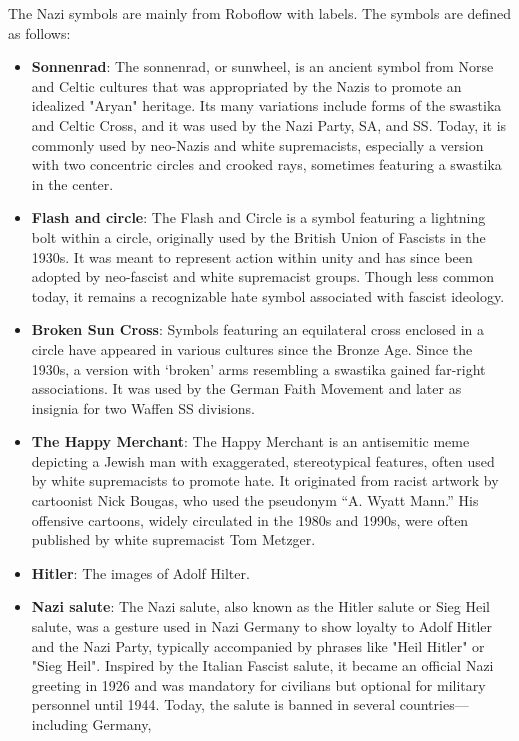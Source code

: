 The Nazi symbols are mainly from Roboflow with labels. The symbols are defined as follows:

\begin{itemize}
  \item \textbf{Sonnenrad}: The sonnenrad, or sunwheel, is an ancient symbol
  from Norse and Celtic cultures that was appropriated by the Nazis to
  promote an idealized "Aryan" heritage. Its many variations include forms
  of the swastika and Celtic Cross, and it was used by the Nazi Party,
  SA, and SS. Today, it is commonly used by neo-Nazis and white
  supremacists, especially a version with two concentric circles and
  crooked rays, sometimes featuring a swastika in the center.
  \item \textbf{Flash and circle}: The Flash and Circle is a symbol featuring
  a lightning bolt within a circle, originally used by the British Union
  of Fascists in the 1930s. It was meant to represent action within unity
  and has since been adopted by neo-fascist and white supremacist groups.
  Though less common today, it remains a recognizable hate symbol associated
  with fascist ideology.
  \item \textbf{Broken Sun Cross}: Symbols featuring an equilateral cross enclosed
  in a circle have appeared in various cultures since the Bronze Age. Since
  the 1930s, a version with ‘broken’ arms resembling a swastika gained far-right
  associations. It was used by the German Faith Movement and later as insignia
  for two Waffen SS divisions.
  \item \textbf{The Happy Merchant}: The Happy Merchant is an antisemitic meme
  depicting a Jewish man with exaggerated, stereotypical features, often used
  by white supremacists to promote hate. It originated from racist artwork
  by cartoonist Nick Bougas, who used the pseudonym “A. Wyatt Mann.” His
  offensive cartoons, widely circulated in the 1980s and 1990s, were often
  published by white supremacist Tom Metzger.
  \item \textbf{Hitler}: The images of Adolf Hilter.
  \item \textbf{Nazi salute}: The Nazi salute, also known as the Hitler salute
  or Sieg Heil salute, was a gesture used
  in Nazi Germany to show loyalty to Adolf Hitler and the Nazi Party, typically
  accompanied by phrases like "Heil Hitler" or "Sieg Heil". Inspired by the
  Italian Fascist salute, it became an official Nazi greeting in 1926 and
  was mandatory for civilians but optional for military personnel until
  1944. Today, the salute is banned in several countries—including Germany,

\end{itemize}
